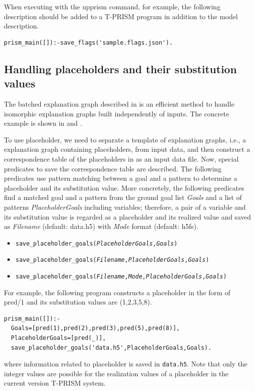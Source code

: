 \documentclass[a4paper]{report}
\begin{document}
When executing with the upprism command, for example, the following description should be added to a T-PRISM program in addition to the model description.
\begin{verbatim}
prism_main([]):-save_flags('sample.flags.json').
\end{verbatim}


\subsection*{Handling placeholders and their substitution values}


The batched explanation graph described in  is an efficient method to handle isomorphic explanation graphs built independently of inputs.
The concrete example is shown in  and .

To use placeholder, we need to separate a template of explanation graphs, i.e., a explanation graph containing placeholders, from input data, and then construct a correspondence table of the placeholders in as an input data file. 
Now, special predicates to save the correspondence table are described.
The following predicates use pattern matching between a goal and a pattern to determine a placeholder and its substitution value.
More concretely, the following predicates find a matched goal and a pattern from the ground goal list {\it Goals} and a list of patterns {\it PlaceholderGoals} including variables; therefore,
a pair of a variable and its substitution value is regarded as a placeholder and its realized value and saved as {\it Filename} (default: data.h5) with {\it Mode} format (default: h5fs).

\begin{itemize}
	\item {\tt save\_placeholder\_goals({\it PlaceholderGoals},{\it Goals})}
	\item {\tt save\_placeholder\_goals({\it Filename},{\it PlaceholderGoals},{\it Goals})}
	\item {\tt save\_placeholder\_goals({\it Filename},{\it Mode},{\it PlaceholderGoals},{\it Goals})}
\end{itemize}

For example, the following program constructs a placeholder in the form of pred/1 and its substitution values are (1,2,3,5,8).
\begin{verbatim}
prism_main([]):-
  Goals=[pred(1),pred(2),pred(3),pred(5),pred(8)],
  PlaceholderGoals=[pred(_)],
  save_placeholder_goals('data.h5',PlaceholderGoals,Goals).
\end{verbatim}
where information related to placeholder is saved in {\tt data.h5}.
Note that only the integer values are possible for the realization values of a placeholder in the current version T-PRISM system.
\end{document}
